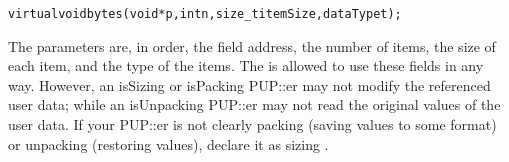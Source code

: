 \begin{alltt}
    virtual void bytes(void *p,int n,size\_t itemSize,dataType t);
\end{alltt}

The parameters are, in order, the field address, the number of items,
the size of each item, and the type of the items. The 
is allowed to use these fields in any way.  However, an isSizing
or isPacking PUP::er may not modify the referenced user data; 
while an isUnpacking PUP::er may not read the original values of 
the user data.  If your PUP::er is not clearly packing (saving values
to some format) or unpacking (restoring values), declare it as 
sizing .



